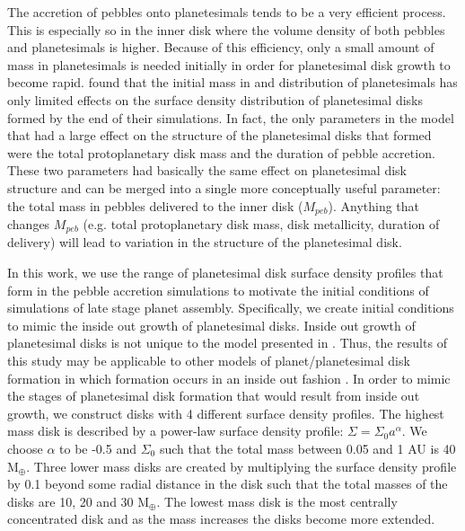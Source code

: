 \documentclass{emulateapj}
\begin{document}
The accretion of pebbles onto planetesimals tends to be a very efficient process. This is especially so in the inner disk where the volume density of both pebbles and planetesimals is higher. Because of this efficiency, only a small amount of mass in planetesimals is needed initially in order for planetesimal disk growth to become rapid. \citet{Moriarty15} found that the initial mass in and distribution of planetesimals has only limited effects on the surface density distribution of planetesimal disks formed by the end of their simulations. In fact, the only parameters in the model that had a large effect on the structure of the planetesimal disks that formed were the total protoplanetary disk mass and the duration of pebble accretion. These two parameters had basically the same effect on planetesimal disk structure and can be merged into a single more conceptually useful parameter: the total mass in pebbles delivered to the inner disk ($M_{peb}$). Anything that changes $M_{peb}$ (e.g. total protoplanetary disk mass, disk metallicity, duration of delivery) will lead to variation in the structure of the planetesimal disk.

In this work, we use the range of planetesimal disk surface density profiles that form in the pebble accretion simulations to motivate the initial conditions of simulations of late stage planet assembly. Specifically, we create initial conditions to mimic the inside out growth of planetesimal disks. Inside out growth of planetesimal disks is not unique to the model presented in \citet{Moriarty15}. Thus, the results of this study may be applicable to other models of planet/planetesimal disk formation in which formation occurs in an inside out fashion \citep[e.g.][]{Chatterjee14}. In order to mimic the stages of planetesimal disk formation that would result from inside out growth, we construct disks with 4 different surface density profiles. The highest mass disk is described by a power-law surface density profile: $\Sigma = \Sigma_0 a^{\alpha}$. We choose $\alpha$ to be -0.5 \citep[][based roughly on the results of]{Moriarty15} and $\Sigma_0$ such that the total mass between 0.05 and 1 AU is 40 M$_{\oplus}$. Three lower mass disks are created by multiplying the surface density profile by 0.1 beyond some radial distance in the disk such that the total masses of the disks are 10, 20 and 30 M$_{\oplus}$. The lowest mass disk is the most centrally concentrated disk and as the mass increases the disks become more extended. 
\end{document}
